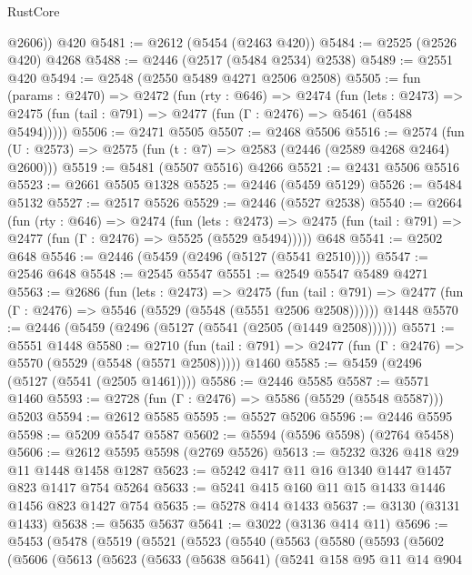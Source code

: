 \begin{lexlean}{RustCore}
\begin{coremodule}
        @2606))
    @420
@5481 := @2612 (@5454 (@2463 @420))
@5484 := @2525 (@2526 @420) @4268
@5488 := @2446 (@2517 (@5484 @2534) @2538)
@5489 := @2551 @420
@5494 := @2548 (@2550 @5489 @4271 @2506 @2508)
@5505 := fun (params : @2470) =>
  @2472
    (fun (rty : @646) =>
    @2474
      (fun (lets : @2473) =>
      @2475 (fun (tail : @791) => @2477 (fun (Γ : @2476) => @5461 (@5488 @5494)))))
@5506 := @2471 @5505
@5507 := @2468 @5506
@5516 := @2574 (fun (U : @2573) => @2575 (fun (t : @7) => @2583 (@2446 (@2589 @4268 @2464) @2600)))
@5519 := @5481 (@5507 @5516) @4266
@5521 := @2431 @5506 @5516
@5523 := @2661 @5505 @1328
@5525 := @2446 (@5459 @5129)
@5526 := @5484 @5132
@5527 := @2517 @5526
@5529 := @2446 (@5527 @2538)
@5540 := @2664
    (fun (rty : @646) =>
    @2474
      (fun (lets : @2473) =>
      @2475 (fun (tail : @791) => @2477 (fun (Γ : @2476) => @5525 (@5529 @5494)))))
    @648
@5541 := @2502 @648
@5546 := @2446 (@5459 (@2496 (@5127 (@5541 @2510))))
@5547 := @2546 @648
@5548 := @2545 @5547
@5551 := @2549 @5547 @5489 @4271
@5563 := @2686
    (fun (lets : @2473) =>
    @2475
      (fun (tail : @791) => @2477 (fun (Γ : @2476) => @5546 (@5529 (@5548 (@5551 @2506 @2508))))))
    @1448
@5570 := @2446 (@5459 (@2496 (@5127 (@5541 (@2505 (@1449 @2508))))))
@5571 := @5551 @1448
@5580 := @2710
    (fun (tail : @791) => @2477 (fun (Γ : @2476) => @5570 (@5529 (@5548 (@5571 @2508)))))
    @1460
@5585 := @5459 (@2496 (@5127 (@5541 (@2505 @1461))))
@5586 := @2446 @5585
@5587 := @5571 @1460
@5593 := @2728 (fun (Γ : @2476) => @5586 (@5529 (@5548 @5587))) @5203
@5594 := @2612 @5585
@5595 := @5527 @5206
@5596 := @2446 @5595
@5598 := @5209 @5547 @5587
@5602 := @5594 (@5596 @5598) (@2764 @5458)
@5606 := @2612 @5595 @5598 (@2769 @5526)
@5613 := @5232 @326 @418 @29 @11 @1448 @1458 @1287
@5623 := @5242 @417 @11 @16 @1340 @1447 @1457 @823 @1417 @754 @5264
@5633 := @5241 @415 @160 @11 @15 @1433 @1446 @1456 @823 @1427 @754
@5635 := @5278 @414 @1433
@5637 := @3130 (@3131 @1433)
@5638 := @5635 @5637
@5641 := @3022 (@3136 @414 @11)
@5696 := @5453
    (@5478
      (@5519
        (@5521
          (@5523
            (@5540
              (@5563
                (@5580
                  (@5593
                    (@5602
                      (@5606
                        (@5613
                          (@5623
                            (@5633
                              (@5638 @5641)
                              (@5241
                                @158
                                @95
                                @11
                                @14
                                @904

\end{coremodule}
\end{lexlean}
